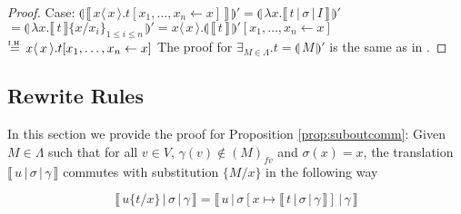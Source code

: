 \documentclass[a4paper,UKenglish,cleveref, autoref]{lipics-v2019}
\newcommand{\fv}[1]{(#1)_{fv}}
\newcommand{\abs}[2]{\lambda #1 . #2}
\newcommand{\fake}[3]{#1 \langle \, #2 \, \rangle . #3}
\newcommand{\share}[3]{#1 [#2 \leftarrow #3]}
\newcommand{\sub}[3]{#1 \{ #2 / #3 \}}
\newcommand{\compile}[1]{\llparenthesis \, #1 \, \rrparenthesis}
\newcommand{\readbackclose}[1]{\llbracket \, #1 \, \rrbracket }
\newcommand{\readbackwmap}[3]{\llbracket \, #1 \, \vert \, #2 \, \vert \, #3  \, \rrbracket }
\newcommand{\IH}{\stackrel{\hbox{\tiny I.H.}}{\hbox{=}}}
\begin{document}
\begin{proof}
\newline
\newline
\indent Case: $\compile{\readbackclose{\fake{x}{x}{t \share{}{x_{1}, \dots, x_{n}}{x}}}}' = \compile{\abs{x}{\readbackwmap{t}{\sigma}{I}}}'$
\newline
\indent $= \compile{\abs{x}{\readbackclose{t} \sub{}{x}{x_{i}}_{1 \leq i \leq n}}}' = \fake{x}{x}{ \compile{\readbackclose{t}}' \share{}{x_{1}, \dots, x_{n}}{x}}$
\newline
\indent $ \IH \fake{x}{x}{ t \share{}{x_{1}, \dots, x_{n}}{x}} $
\newline
\newline
The proof for $\exists_{ M \in \Lambda} . t = \compile{M}'$ is the same as in \cite{gundersen2013atomic}.
\end{proof}

\subsection{Rewrite Rules}

In this section we provide the proof for Proposition \ref{prop:suboutcomm}: Given $M \in \Lambda$ such that for all $v \in V$, $\gamma(v) \not\in \fv{M}$  and $\sigma(x) = x$, the translation $\readbackwmap{u}{\sigma}{\gamma}$ commutes with substitution $\sub{}{M}{x}$ in the following way 

$$\readbackwmap{u \sub{}{t}{x}}{\sigma}{\gamma} = \readbackwmap{u}{\sigma[x \mapsto \readbackwmap{t}{\sigma}{\gamma}]}{\gamma}$$

%
\end{document}
